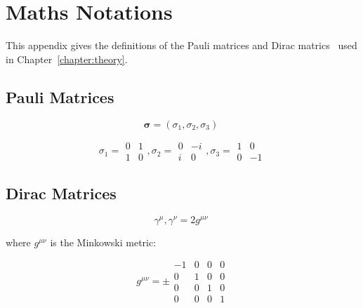 \chapter{Maths Notations}\label{app:maths}
This appendix gives the definitions of the Pauli matrices and Dirac matrics~\cite{Cheng:1985bj} used in Chapter~\ref{chapter:theory}.

\section*{Pauli Matrices}

\begin{equation}
\mathbf{\sigma} = ( \sigma_{1}, \sigma_{2}, \sigma_{3} ) \;
\end{equation}

\begin{equation}
\sigma_{1} = \begin{matrix}
0 & 1 \\
1 & 0
\end{matrix} ,
\sigma_{2} = \begin{matrix}
0 & -i \\
i & 0
\end{matrix} ,
\sigma_{3} = \begin{matrix}
1 & 0 \\
0 & -1
\end{matrix}
\end{equation}


\section*{Dirac Matrices}

\begin{equation}
{ {\gamma}^{\mu} , {\gamma}^{\nu} } = 2g^{\mu \nu} \;
\label{eq:gamma}
\end{equation}

where $g^{\mu \nu}$ is the Minkowski metric:

\begin{equation}
g^{\mu \nu} = \pm \begin{matrix}
-1 & 0 & 0 & 0 \\
0 & 1 & 0 & 0 \\
0 & 0 & 1 & 0 \\
0 & 0 & 0 & 1
\end{matrix}
\label{eq:minkowiski}
\end{equation}
